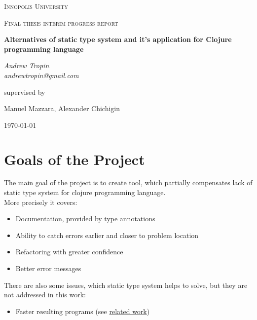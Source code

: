 \documentclass[12pt,a4paper]{report}
\begin{document}
\begin{titlepage}
	\centering
	{\scshape\LARGE Innopolis University \par}
	\vspace{1cm}
	{\scshape\Large Final thesis interim progress report \par}
	\vspace{1.5cm}
	{\huge\bfseries
    Alternatives of static type system and it's application for Clojure programming language
    \par}
	\vspace{2cm}
	{\Large\itshape Andrew Tropin\\
    andrewtropin@gmail.com
    \par}
	\vfill
	supervised by\par
	Manuel Mazzara, Alexander Chichigin

	\vfill

	{\large \today\par}
\end{titlepage}

\section*{Goals of the Project}

The main goal of the project is to create tool, which partially compensates lack
of static type system for clojure programming language.\\

More precisely it covers:
\begin{itemize}
\item Documentation, provided by type annotations
\item Ability to catch errors earlier and closer to problem location
\item Refactoring with greater confidence
\item Better error messages
\end{itemize}

There are also some issues, which static type system helps to solve, but they are not
addressed in this work:
\begin{itemize}
\item Faster resulting programs
  (see \href{https://www.youtube.com/watch?v=yGko70hIEwk&t=295s}{related work})
\end{itemize}
\end{document}
